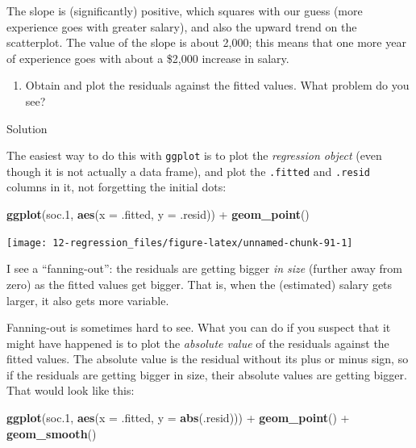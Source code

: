 \documentclass[]{tufte-book}
\newenvironment{Shaded}{}{}
\newcommand{\DataTypeTok}[1]{\textcolor[rgb]{0.56,0.13,0.00}{#1}}
\newcommand{\FloatTok}[1]{\textcolor[rgb]{0.25,0.63,0.44}{#1}}
\newcommand{\KeywordTok}[1]{\textcolor[rgb]{0.00,0.44,0.13}{\textbf{#1}}}
\newcommand{\NormalTok}[1]{#1}
\newcommand{\OperatorTok}[1]{\textcolor[rgb]{0.40,0.40,0.40}{#1}}
\newcommand{\StringTok}[1]{\textcolor[rgb]{0.25,0.44,0.63}{#1}}
\providecommand{\tightlist}{%
  \setlength{\itemsep}{0pt}\setlength{\parskip}{0pt}}
\theoremstyle{definition}
\theoremstyle{definition}
\theoremstyle{definition}
\theoremstyle{remark}
\begin{document}
The slope is (significantly) positive, which squares with our guess
(more experience goes with greater salary), and also the upward trend on
the scatterplot. The value of the slope is about 2,000; this means that
one more year of experience goes with about a \$2,000 increase in
salary.

\begin{enumerate}
\def\labelenumi{(\alph{enumi})}
\setcounter{enumi}{3}
\tightlist
\item
  Obtain and plot the residuals against the fitted values. What problem
  do you see?
\end{enumerate}

Solution

The easiest way to do this with \texttt{ggplot} is to plot the
\emph{regression object} (even though it is not actually a data frame),
and plot the \texttt{.fitted} and \texttt{.resid} columns in it, not
forgetting the initial dots:

\begin{Shaded}
\begin{Highlighting}[]
\KeywordTok{ggplot}\NormalTok{(soc}\FloatTok{.1}\NormalTok{, }\KeywordTok{aes}\NormalTok{(}\DataTypeTok{x =}\NormalTok{ .fitted, }\DataTypeTok{y =}\NormalTok{ .resid)) }\OperatorTok{+}\StringTok{ }
\StringTok{    }\KeywordTok{geom_point}\NormalTok{()}
\end{Highlighting}
\end{Shaded}

\texttt{[image: 12-regression\_files/figure-latex/unnamed-chunk-91-1]}

I see a ``fanning-out'': the residuals are getting bigger \emph{in size}
(further away from zero) as the fitted values get bigger. That is, when
the (estimated) salary gets larger, it also gets more variable.

Fanning-out is sometimes hard to see. What you can do if you suspect
that it might have happened is to plot the \emph{absolute value} of the
residuals against the fitted values. The absolute value is the residual
without its plus or minus sign, so if the residuals are getting bigger
in size, their absolute values are getting bigger. That would look like
this:

\begin{Shaded}
\begin{Highlighting}[]
\KeywordTok{ggplot}\NormalTok{(soc}\FloatTok{.1}\NormalTok{, }\KeywordTok{aes}\NormalTok{(}\DataTypeTok{x =}\NormalTok{ .fitted, }\DataTypeTok{y =} \KeywordTok{abs}\NormalTok{(.resid))) }\OperatorTok{+}\StringTok{ }
\StringTok{    }\KeywordTok{geom_point}\NormalTok{() }\OperatorTok{+}\StringTok{ }\KeywordTok{geom_smooth}\NormalTok{()}
\end{Highlighting}
\end{Shaded}
\end{document}
